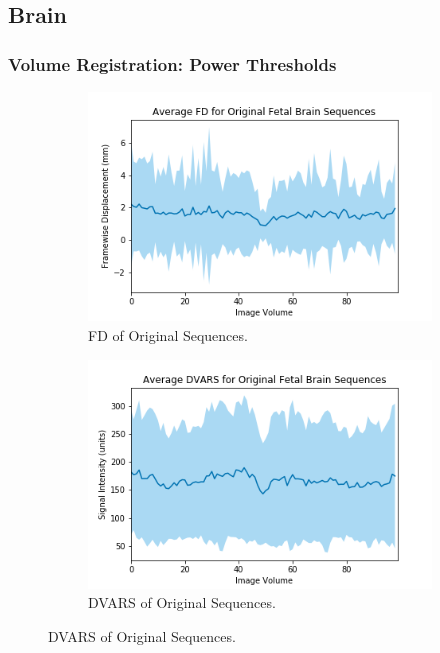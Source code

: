\subsection{Brain}

\subsubsection{Volume Registration: Power Thresholds}

\begin{figure}[t]
	\centering
	\begin{subfigure}{0.4\textwidth}
		\centering
		\includegraphics[width=1.0\textwidth]{6/figures/fetal-brain-bold-fd-150.png}
		\caption{FD of Original Sequences.}
	\end{subfigure}
	\hspace{0.05\textwidth}
	\begin{subfigure}{0.4\textwidth}
		\centering
		\includegraphics[width=1.0\textwidth]{6/figures/fetal-brain-bold-dvars-150.png}
		\caption{DVARS of Original Sequences.}
	\end{subfigure}
	

\end{figure}
